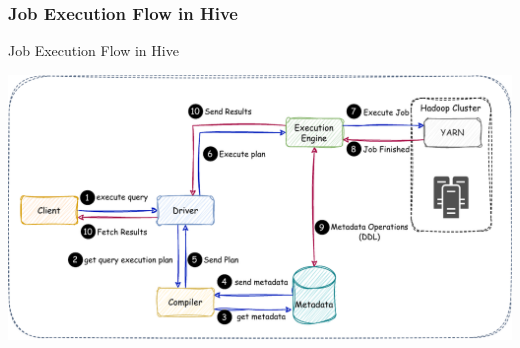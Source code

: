 \subsubsection{Job Execution Flow in Hive}
\begin{frame}{Job Execution Flow in Hive}

\includegraphics[width=\textwidth,height=\textheight,keepaspectratio]{./Figures/chapter-03/Hive_Query_Flow.pdf}

	\end{frame}


